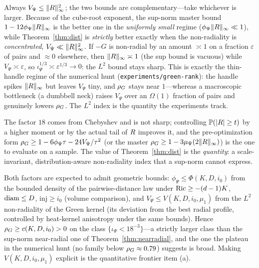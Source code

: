 \begin{remark}
Always $V_\Psi\le\lVert R\rVert_\infty^2$; the two bounds are complementary---take whichever
is larger. Because of the cube-root exponent, the sup-norm master bound $1-12\phi_\Psi
\lVert R\rVert_\infty$ is the better one in the \emph{uniformly small} regime
($\phi_\Psi\lVert R\rVert_\infty\ll1$), while Theorem~\ref{thm:dist} is \emph{strictly}
better exactly when the non-radiality is \emph{concentrated}, $V_\Psi\ll\lVert R\rVert_\infty^2$.
If $-G$ is non-radial by an amount $\asymp1$ on a fraction $\varepsilon$ of pairs and
$\approx0$ elsewhere, then $\lVert R\rVert_\infty\asymp1$ (the sup bound is vacuous) while
$V_\Psi\asymp\varepsilon$, so $\iota_\Psi^{1/3}\asymp\varepsilon^{1/3}\to0$: the $L^2$ bound
stays sharp. This is exactly the thin-handle regime of the numerical hunt
(\texttt{experiments/green-rank}): the handle spikes $\lVert R\rVert_\infty$ but leaves
$V_\Psi$ tiny, and $\rho_G$ stays near $1$---whereas a macroscopic bottleneck (a dumbbell
neck) raises $V_\Psi$ over an $\Omega(1)$ fraction of pairs and genuinely lowers $\rho_G$.
The $L^2$ index is the quantity the experiments track.
\end{remark}

\begin{remark}
The factor $18$ comes from Chebyshev and is not sharp; controlling
$\mathbb P(\lvert R\rvert\ge t)$ by a higher moment or by the actual tail of $R$
improves it, and the pre-optimization form $\rho_G\ge1-6\phi_\Psi\tau-24V_\Psi/\tau^2$ (or
the master $\rho_G\ge1-3\mu_\Psi(2\lVert R\rVert_\infty)$) is the one to evaluate on a
sample. The value of Theorem~\ref{thm:dist} is the \emph{quantity}: a scale-invariant,
distribution-aware non-radiality index that a sup-norm cannot express.
\end{remark}

\begin{remark}
Both factors are expected to admit geometric bounds: $\phi_\Psi\le\Phi(K,D,i_0)$ from the bounded density
of the pairwise-distance law under $\operatorname{Ric}\ge-(d-1)K$, $\operatorname{diam}\le D$, $\mathrm{inj}\ge i_0$
(volume comparison), and $V_\Psi\le V(K,D,i_0,\mu_1)$ from the $L^2$ non-radiality of the
Green kernel (its deviation from the best radial profile, controlled by heat-kernel
anisotropy under the same bounds). Hence $\rho_G\ge c(K,D,i_0)>0$ on the class
$\{\iota_\Psi<18^{-3}\}$---a strictly larger class than the sup-norm near-radial one of
Theorem~\ref{thm:nearradial}, and the one the plateau in the numerical hunt (no family below
$\rho_G\approx0.79$) suggests is broad. Making $V(K,D,i_0,\mu_1)$ explicit is the quantitative
frontier item (a).
\end{remark}

